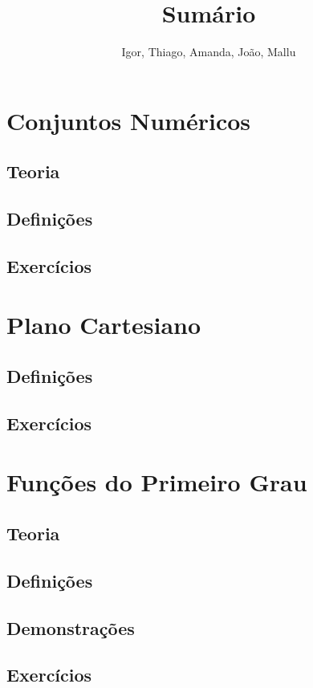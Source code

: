 \documentclass[portuguese, 12pt, a4paper]{article}
\title{Sumário}
\author{Igor, Thiago, Amanda, João, Mallu}
\begin{document}
	
	\maketitle
	
	\tableofcontents
	
	\section{Conjuntos Numéricos}
	\subsection{Teoria}
	\subsection{Definições}
	\subsection{Exercícios}
	
	\section{Plano Cartesiano}
	\subsection{Definições}
	\subsection{Exercícios}
	
	\section{Funções do Primeiro Grau}
	\subsection{Teoria}
	\subsection{Definições}
	\subsection{Demonstrações}
	\subsection{Exercícios}
	
\end{document}
